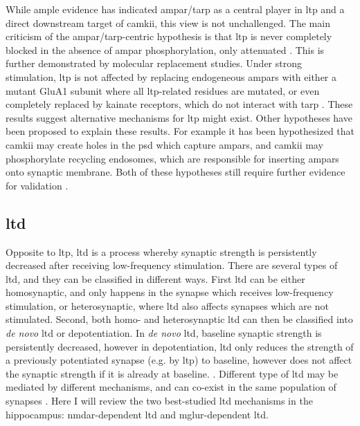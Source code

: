 While ample evidence has indicated \gls{ampar}\slash\gls{tarp} as a central player in \gls{ltp} and a direct downstream target of \gls{camkii}, this view is not unchallenged. The main criticism of the \gls{ampar}\slash\gls{tarp}-centric hypothesis is that \gls{ltp} is never completely blocked in the absence of \gls{ampar} phosphorylation, only attenuated \citep{herring16}. This is further demonstrated by molecular replacement studies. Under strong stimulation, \gls{ltp} is not affected by replacing endogeneous \glspl{ampar} with either a mutant GluA1 subunit where all \gls{ltp}-related residues are mutated, or even completely replaced by kainate receptors, which do not interact with \gls{tarp} \citep{granger13, chen03}. These results suggest alternative mechanisms for \gls{ltp} might exist. Other hypotheses have been proposed to explain these results. For example it has been hypothesized that \gls{camkii} may create holes in the \gls{psd} which capture \glspl{ampar}, and \gls{camkii} may phosphorylate recycling endosomes, which are responsible for inserting \glspl{ampar} onto synaptic membrane. Both of these hypotheses still require further evidence for validation \citep{herring16}.

\subsection{\gls{ltd}}

Opposite to \gls{ltp}, \gls{ltd} is a process whereby synaptic strength is persistently decreased after receiving low-frequency stimulation. There are several types of \gls{ltd}, and they can be classified in different ways. First \gls{ltd} can be either homosynaptic, and only happens in the synapse which receives low-frequency stimulation, or heterosynaptic, where \gls{ltd} also affects synapses which are not stimulated. Second, both homo- and heterosynaptic \gls{ltd} can then be classified into \textit{de novo} \gls{ltd} or depotentiation. In \textit{de novo} \gls{ltd}, baseline synaptic strength is persistently decreased, however in depotentiation, \gls{ltd} only reduces the strength of a previously potentiated synapse (e.g. by \gls{ltp}) to baseline, however does not affect the synaptic strength if it is already at baseline. \citep{collingridge10}. Different type of \gls{ltd} may be mediated by different mechanisms, and can co-exist in the same population of synapses \citep{collingridge10}. Here I will review the two best-studied \gls{ltd} mechanisms in the hippocampus: \gls{nmdar}-dependent \gls{ltd} and \gls{mglur}-dependent \gls{ltd}.

